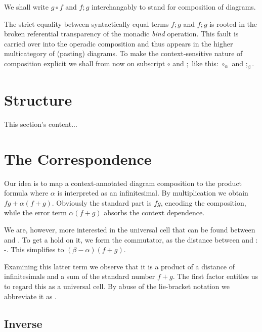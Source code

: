 \documentclass{article}
\begin{document}
We shall write $g \circ f$ and $f;g$ interchangably to stand for
composition of diagrams.

The strict equality between syntactically equal terms $f;g$ and $f;g$
is rooted in the broken referential transparency of the monadic
\emph{bind} operation. This fault is carried over into the operadic
composition and thus appears in the higher multicategory of (pasting)
diagrams. To make the context-sensitive nature of composition explicit
we shall from now on subscript $\circ$ and $;$ like this: ${\circ_\alpha}$
and ${;_\beta}$.

\section{Structure}
This section's content...

\section{The Correspondence}

Our idea is to map a context-annotated diagram composition 
to the product formula  where $\alpha$ is interpreted as
an infinitesimal. By multiplication we obtain $fg+\alpha(f+g)$. Obviously the
standard part is $fg$, encoding the composition, while the error term $\alpha(f+g)$
absorbs the context dependence.

We are, however, more interested in the universal cell that can be found between
  and . To get a hold on it, we form the
commutator, as the distance between  and :
-. This simplifies to $(\beta-\alpha)(f+g)$.

%

Examining this latter term we observe that it is a product of a distance of infinitesimals
and a sum of the standard number $f+g$. The first factor entitles us to regard this as a
universal cell. By abuse of the lie-bracket notation we abbreviate it as
.

\subsection{Inverse}
\end{document}
